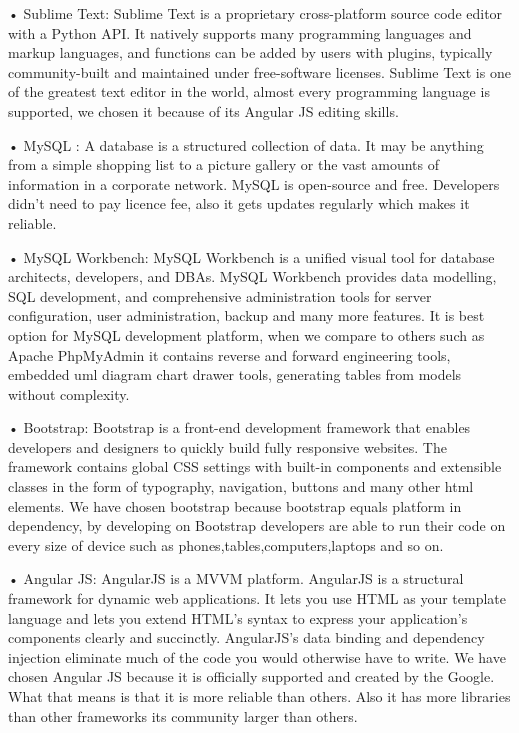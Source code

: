 • Sublime Text: Sublime Text is a proprietary cross-platform source code editor with a Python API. It natively supports many programming languages and markup languages, and functions can be added by users with plugins, typically community-built and maintained under free-software licenses. \cite{sublimeTanim}
Sublime Text is one of the greatest text editor in the world, almost every programming language is supported, we chosen it because of its Angular JS editing skills.


• MySQL : A database is a structured collection of data. It may be anything from a simple shopping list to a picture gallery or the vast amounts of information in a corporate network. \cite{mySQLTanim}
 MySQL is open-source and free. Developers didn't need to pay licence fee, also it gets updates regularly which makes it reliable.


• MySQL Workbench: MySQL Workbench is a unified visual tool for database architects, developers, and DBAs. MySQL Workbench provides data modelling, SQL development, and comprehensive administration tools for server configuration, user administration, backup and many more features. \cite{mySQLWorkTanim}
It is best option for MySQL development platform, when we compare to others such as Apache PhpMyAdmin it contains reverse and forward engineering tools, embedded uml diagram chart drawer tools, generating tables from models without complexity.


• Bootstrap: Bootstrap is a front-end development framework that enables developers and designers to quickly build fully responsive websites. The framework contains global CSS settings with built-in components and extensible classes in the form of typography, navigation, buttons and many other html elements. \cite{BootstrapTanim}
 We have chosen bootstrap because bootstrap equals platform in dependency, by developing on Bootstrap developers are able to run their code on every size of device such as phones,tables,computers,laptops and so on.


• Angular JS: AngularJS is a MVVM platform.  AngularJS is a structural framework for dynamic web applications. It lets you use HTML as your template language and lets you extend HTML’s syntax to express your application's components clearly and succinctly. AngularJS’s data binding and dependency injection eliminate much of the code you would otherwise have to write. \cite{AngularJSTanim}
 We have chosen Angular JS because it is officially supported and created by the Google. What that means is that it is more reliable than others. Also it has more libraries than other frameworks its community larger than others.

